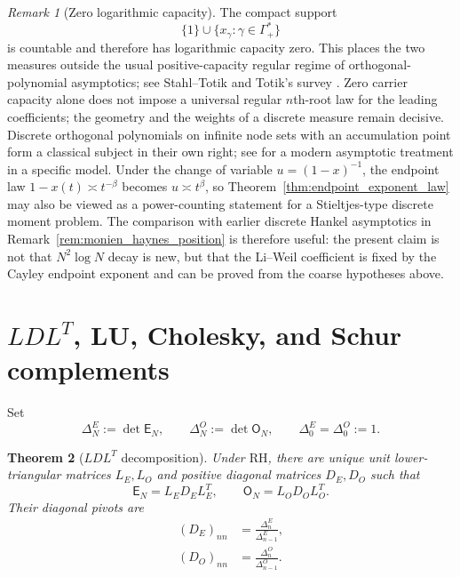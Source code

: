 \documentclass[preprint,12pt]{elsarticle}
\numberwithin{equation}{section}
\theoremstyle{plain}
\newtheorem{theorem}{Theorem}[section]
\theoremstyle{definition}
\theoremstyle{remark}
\newtheorem{remark}[theorem]{Remark}
\newcommand{\RH}{\mathrm{RH}}
\newcommand{\E}{\mathsf E}
\newcommand{\Omat}{\mathsf O}
\begin{document}
\begin{remark}[Zero logarithmic capacity]
\label{rem:zero_capacity_support}
The compact support
\begin{equation}
\{1\}\cup\{x_\gamma:\gamma\in\Gamma_+^*\}
\label{eq:polar_support}
\end{equation}
is countable and therefore has logarithmic capacity zero. This places the two measures outside the usual positive-capacity regular regime of orthogonal-polynomial asymptotics; see Stahl--Totik \cite{StahlTotik1992} and Totik's survey \cite{Totik2005Orthogonal}. Zero carrier capacity alone does not impose a universal regular $n$th-root law for the leading coefficients; the geometry and the weights of a discrete measure remain decisive. Discrete orthogonal polynomials on infinite node sets with an accumulation point form a classical subject in their own right; see \cite{WuLinXuZhao2016} for a modern asymptotic treatment in a specific model. Under the change of variable $u=(1-x)^{-1}$, the endpoint law $1-x(t)\asymp t^{-\beta}$ becomes $u\asymp t^{\beta}$, so Theorem~\ref{thm:endpoint_exponent_law} may also be viewed as a power-counting statement for a Stieltjes-type discrete moment problem. The comparison with earlier discrete Hankel asymptotics in Remark~\ref{rem:monien_haynes_position} is therefore useful: the present claim is not that $N^2\log N$ decay is new, but that the Li--Weil coefficient is fixed by the Cayley endpoint exponent and can be proved from the coarse hypotheses above.
\end{remark}

\section{\texorpdfstring{$LDL^T$}{LDL\textasciicircum T}, LU, Cholesky, and Schur complements}
\label{sec:factorizations}

Set
\begin{equation}
\Delta_N^E:=\det\E_N,
\qquad
\Delta_N^O:=\det\Omat_N,
\qquad
\Delta_0^E=\Delta_0^O:=1.
\label{eq:delta_definitions}
\end{equation}

\begin{theorem}[$LDL^T$ decomposition]
\label{thm:LDL}
Under $\RH$, there are unique unit lower-triangular matrices $L_E,L_O$ and positive diagonal matrices $D_E,D_O$ such that
\begin{equation}
\E_N=L_E D_E L_E^T,
\qquad
\Omat_N=L_O D_O L_O^T.
\label{eq:LDL_decompositions}
\end{equation}
Their diagonal pivots are
\begin{align}
(D_E)_{nn}&=\frac{\Delta_n^E}{\Delta_{n-1}^E},
\label{eq:E_LDL_pivots}\\
(D_O)_{nn}&=\frac{\Delta_n^O}{\Delta_{n-1}^O}.
\label{eq:O_LDL_pivots}
\end{align}
\end{theorem}
\end{document}
